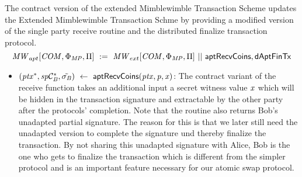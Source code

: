 \begin{definition}
    \label{def:atom:apt-ext-mw-tx-scheme}
    The contract version of the extended Mimblewimble Transaction Scheme updates the Extended Mimblewimble Transaction Schme by providing a modified version of the single party receive routine and the distributed finalize transaction protocol.
    \[ \mathit{MW}_{apt}[\mathit{COM},\Phi_{\mathit{MP}},\Pi] ~:=~ \mathit{MW}_{ext}[\mathit{COM},\Phi_{\mathit{MP}},\Pi] ~||~ \mathsf{aptRecvCoins}, \mathsf{dAptFinTx} \]
    \begin{itemize}
        \item $(\mathit{ptx}^*, \mathit{sp}\mathcal{C}_{\mathit{B}}^*, \tilde{\sigma_{\mathit{B}}}) ~\leftarrow~ \mathsf{aptRecvCoins}(\mathit{ptx},\mathit{p},\mathit{x})$: The contract variant of the receive function takes an additional input a secret witness value
        $\mathit{x}$ which will be hidden in the transaction signature and extractable by the other party after the protocols' completion.
        Note that the routine also returns Bob's unadapted partial signature.
        The reason for this is that we later still need the unadapted version to complete the signature und thereby finalize the transaction.
        By not sharing this unadapted signature with Alice, Bob is the one who gets to finalize the transaction which is different from the simpler protocol and is an important feature necessary for our atomic swap protocol.
        
        

\end{itemize}
\end{definition}
